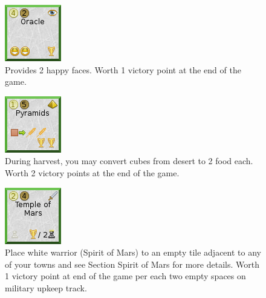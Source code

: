 \documentclass[11pt,a4paper,titlepage]{article}
\begin{document}
{  \begin{figure}[!htb]
    \begin{minipage}[c]{0.1\textwidth}
      \includegraphics[scale=.7]{doe_wonder_oracle.png}
    \end{minipage}\hfill
    \begin{minipage}[c]{0.6\textwidth}
      \captionsetup{labelformat=empty, justification=justified, singlelinecheck=false}
      \caption{Provides 2 happy faces. Worth 1 victory point at the end of the game.}
    \end{minipage}\hfill
    \label{fig:wonder_oracle}
  \end{figure}

  \begin{figure}[!htb]
    \begin{minipage}[c]{0.1\textwidth}
      \includegraphics[scale=.7]{doe_wonder_pyramids.png}
    \end{minipage}\hfill
    \begin{minipage}[c]{0.6\textwidth}
      \captionsetup{labelformat=empty, justification=justified, singlelinecheck=false}
      \caption{During harvest, you may convert cubes from desert to 2 food each. Worth 2 victory points at the end of the game.}
    \end{minipage}\hfill
    \label{fig:wonder_pyramids}
  \end{figure}

  \begin{figure}[!htb]
    \begin{minipage}[c]{0.1\textwidth}
      \includegraphics[scale=.7]{doe_wonder_temple_of_mars.png}
    \end{minipage}\hfill
    \begin{minipage}[c]{0.6\textwidth}
      \captionsetup{labelformat=empty, justification=justified, singlelinecheck=false}
      \caption{Place white warrior (Spirit of Mars) to an empty tile adjacent
        to any of your towns and see Section Spirit of Mars for more details.
        Worth 1 victory point at end of the game per each two empty spaces on military upkeep track.}
    \end{minipage}\hfill
    \label{fig:wonder_temple_of_mars}
  \end{figure}

}
\end{document}
